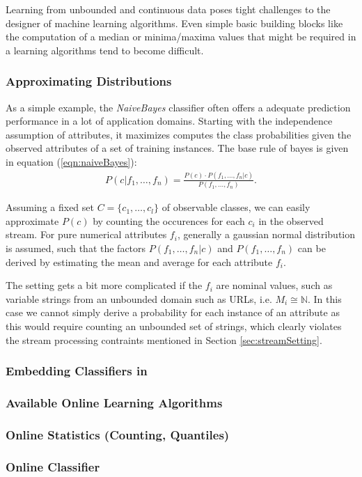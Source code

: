Learning from unbounded and continuous data poses tight challenges to
the designer of machine learning algorithms. Even simple basic
building blocks like the computation of a median or minima/maxima
values that might be required in a learning algorithms tend to become
difficult.


\subsubsection*{Approximating Distributions}
As a simple example, the {\em NaiveBayes}\cite{NB} classifier often
offers a adequate prediction performance in a lot of application
domains. Starting with the independence assumption of attributes, it
maximizes computes the class probabilities given the observed
attributes of a set of training instances. The base rule of bayes is
given in equation (\ref{eqn:naiveBayes}):
\begin{eqnarray}
  P(c | f_1,\ldots,f_n ) = \frac{P(c)\cdot P(f_1,\ldots,f_n|c)}{P(f_1,\ldots,f_n)}.\label{eqn:naiveBayes}
\end{eqnarray}

Assuming a fixed set $C = \{c_1,\ldots,c_l\}$ of observable classes, we
can easily approximate $P(c)$ by counting the occurences for each
$c_i$ in the observed stream. For pure numerical attributes $f_i$,
generally a gaussian normal distribution is assumed, such that the
factors $P(f_1,\ldots,f_n|c)$ and $P(f_1,\ldots,f_n)$ can be derived
by estimating the mean and average for each attribute $f_i$.

The setting gets a bit more complicated if the $f_i$ are nominal
values, such as variable strings from an unbounded domain such as
URLs, i.e. $M_i \cong \mathbb{N}$. In this case we cannot simply
derive a probability for each instance of an attribute as this would
require counting an unbounded set of strings, which clearly violates
the stream processing contraints mentioned in Section
\ref{sec:streamSetting}.

\subsubsection{Embedding Classifiers in \streams}


\subsubsection{Available Online Learning Algorithms}

\subsubsection*{Online Statistics (Counting, Quantiles)}

\subsubsection*{Online Classifier}



